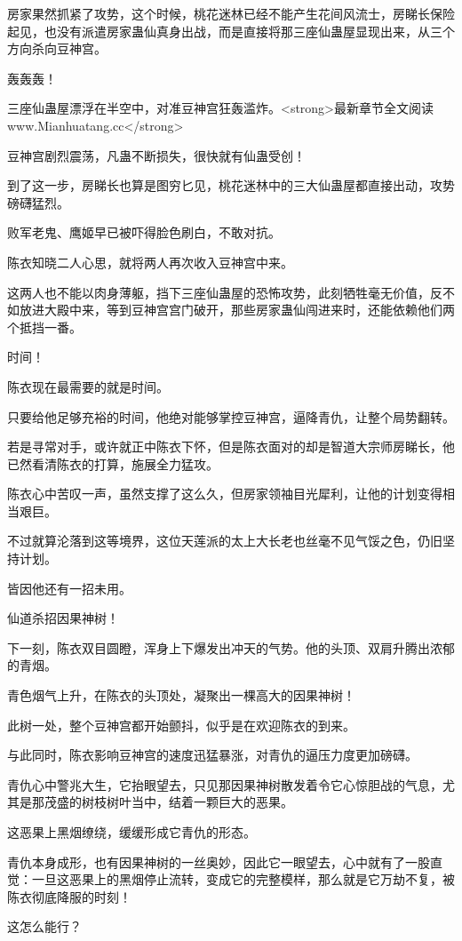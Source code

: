 \begin{this_body}
房家果然抓紧了攻势，这个时候，桃花迷林已经不能产生花间风流士，房睇长保险起见，也没有派遣房家蛊仙真身出战，而是直接将那三座仙蛊屋显现出来，从三个方向杀向豆神宫。

轰轰轰！

三座仙蛊屋漂浮在半空中，对准豆神宫狂轰滥炸。<strong>最新章节全文阅读www.Mianhuatang.cc</strong>

豆神宫剧烈震荡，凡蛊不断损失，很快就有仙蛊受创！

到了这一步，房睇长也算是图穷匕见，桃花迷林中的三大仙蛊屋都直接出动，攻势磅礴猛烈。

败军老鬼、鹰姬早已被吓得脸色刷白，不敢对抗。

陈衣知晓二人心思，就将两人再次收入豆神宫中来。

这两人也不能以肉身薄躯，挡下三座仙蛊屋的恐怖攻势，此刻牺牲毫无价值，反不如放进大殿中来，等到豆神宫宫门破开，那些房家蛊仙闯进来时，还能依赖他们两个抵挡一番。

时间！

陈衣现在最需要的就是时间。

只要给他足够充裕的时间，他绝对能够掌控豆神宫，逼降青仇，让整个局势翻转。

若是寻常对手，或许就正中陈衣下怀，但是陈衣面对的却是智道大宗师房睇长，他已然看清陈衣的打算，施展全力猛攻。

陈衣心中苦叹一声，虽然支撑了这么久，但房家领袖目光犀利，让他的计划变得相当艰巨。

不过就算沦落到这等境界，这位天莲派的太上大长老也丝毫不见气馁之色，仍旧坚持计划。

皆因他还有一招未用。

仙道杀招因果神树！

下一刻，陈衣双目圆瞪，浑身上下爆发出冲天的气势。他的头顶、双肩升腾出浓郁的青烟。

青色烟气上升，在陈衣的头顶处，凝聚出一棵高大的因果神树！

此树一处，整个豆神宫都开始颤抖，似乎是在欢迎陈衣的到来。

与此同时，陈衣影响豆神宫的速度迅猛暴涨，对青仇的逼压力度更加磅礴。

青仇心中警兆大生，它抬眼望去，只见那因果神树散发着令它心惊胆战的气息，尤其是那茂盛的树枝树叶当中，结着一颗巨大的恶果。

这恶果上黑烟缭绕，缓缓形成它青仇的形态。

青仇本身成形，也有因果神树的一丝奥妙，因此它一眼望去，心中就有了一股直觉：一旦这恶果上的黑烟停止流转，变成它的完整模样，那么就是它万劫不复，被陈衣彻底降服的时刻！

这怎么能行？


\end{this_body}
